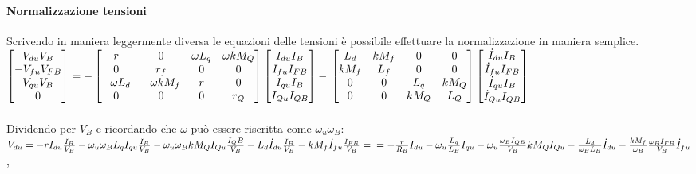 \documentclass[Lau,noexaminfo]{sapthesis}
\begin{document}
	 \paragraph{Normalizzazione tensioni}
	 Scrivendo in maniera leggermente diversa le equazioni delle tensioni è possibile effettuare la normalizzazione in maniera semplice.\\
	 $\begin{bmatrix}
	 V_{du}V_B\\
	 -V_{fu}V_{FB} \\
	 V_{qu}V_B \\
	 0
	 \end{bmatrix}=
	 -\begin{bmatrix}
	 r & 0 & \omega L_q & \omega kM_Q \\
	 0 & r_f & 0 & 0\\
	 -\omega L_d & -\omega kM_f & r & 0\\
	 0 & 0 & 0 & r_Q
	 \end{bmatrix}
	 \begin{bmatrix}
	 I_{du}I_B\\
	 I_{fu}I_{FB}\\
	 I_{qu}I_B\\
	 I_{Qu}I_{QB}
	 \end{bmatrix}
	 -\\\begin{bmatrix}
	 L_d & kM_f & 0 & 0\\
	 kM_f & L_f & 0 & 0\\
	 0 & 0 & L_q &  kM_Q\\
	 0 & 0 & kM_Q & L_Q
	 \end{bmatrix} \begin{bmatrix}
	 \dot{I}_{du}I_B\\
	 \dot{I}_{fu}I_{FB}\\
	 \dot{I}_{qu}I_B\\
	 \dot{I}_{Qu}I_{QB}
	 \end{bmatrix} $\\\\
	 Dividendo per $V_B$ e ricordando che $\omega$ può essere riscritta come $\omega_u \omega_B$:\\
	 $V_{du}=-r I_{du}\frac{I_B}{V_B}-\omega_u \omega_B L_qI_{qu}\frac{I_B}{V_B}-\omega_u \omega_B kM_QI_{Qu}\frac{I_QB}{V_B}-L_d\dot{I}_{du}\frac{I_B}{V_B}-kM_f\dot{I}_{fu}\frac{I_{FB}}{V_B}=\\=-\frac{r}{R_B}I_{du}-\omega_u\frac{L_q}{L_B}I_{qu}-\omega_u\frac{\omega_BI_{QB}}{V_B}kM_QI_{Qu}-\frac{L_d}{\omega_B L_B}\dot{I}_{du}-\frac{kM_f}{\omega_B}\frac{\omega_BI_{FB}}{V_B}\dot{I}_{fu}$,\\\\
\end{document}
